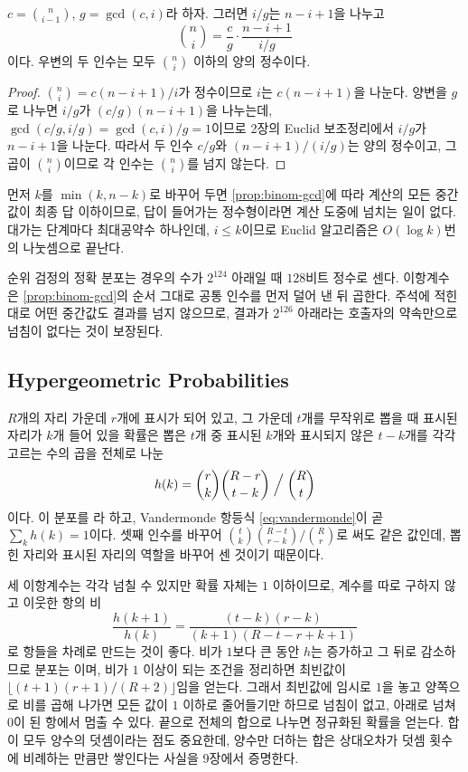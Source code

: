 \begin{proposition}
\label{prop:binom-gcd}
$c=\binom n{i-1}$, $g=\gcd(c,i)$라 하자. 그러면 $i/g$는 $n-i+1$을 나누고
\[
\binom ni=\frac cg\cdot\frac{n-i+1}{i/g}
\]
이다. 우변의 두 인수는 모두 $\binom ni$ 이하의 양의 정수이다.
\end{proposition}

\begin{proof}
$\binom ni=c(n-i+1)/i$가 정수이므로 $i$는 $c(n-i+1)$을 나눈다. 양변을 $g$로 나누면 $i/g$가 $(c/g)(n-i+1)$을 나누는데, $\gcd(c/g,i/g)=\gcd(c,i)/g=1$이므로 2장의 Euclid 보조정리에서 $i/g$가 $n-i+1$을 나눈다. 따라서 두 인수 $c/g$와 $(n-i+1)/(i/g)$는 양의 정수이고, 그 곱이 $\binom ni$이므로 각 인수는 $\binom ni$를 넘지 않는다.
\end{proof}

먼저 $k$를 $\min(k,n-k)$로 바꾸어 두면 \cref{prop:binom-gcd}에 따라 계산의 모든 중간값이 최종 답 이하이므로, 답이 들어가는 정수형이라면 계산 도중에 넘치는 일이 없다. 대가는 단계마다 최대공약수 하나인데, $i\le k$이므로 Euclid 알고리즘은 $O(\log k)$번의 나눗셈으로 끝난다.

\begin{instardust}
순위 검정의 정확 분포는 경우의 수가 $2^{124}$ 아래일 때 $128$비트 정수로 센다. 이항계수 은 \cref{prop:binom-gcd}의 순서 그대로 공통 인수를 먼저 덜어 낸 뒤 곱한다. 주석에 적힌 대로 어떤 중간값도 결과를 넘지 않으므로, 결과가 $2^{126}$ 아래라는 호출자의 약속만으로 넘침이 없다는 것이 보장된다.
\end{instardust}

\subsection{Hypergeometric Probabilities}

$R$개의 자리 가운데 $r$개에 표시가 되어 있고, 그 가운데 $t$개를 무작위로 뽑을 때 표시된 자리가 $k$개 들어 있을 확률은 뽑은 $t$개 중 표시된 $k$개와 표시되지 않은 $t-k$개를 각각 고르는 수의 곱을 전체로 나눈
\begin{equation}
\label{eq:hypergeom}
h(k)=\binom rk\binom{R-r}{t-k}\Bigm/\binom Rt
\end{equation}
이다. 이 분포를 라 하고, Vandermonde 항등식 \cref{eq:vandermonde}이 곧 $\sum_kh(k)=1$이다. 셋째 인수를 바꾸어 $\binom tk\binom{R-t}{r-k}/\binom Rr$로 써도 같은 값인데, 뽑힌 자리와 표시된 자리의 역할을 바꾸어 센 것이기 때문이다.

세 이항계수는 각각 넘칠 수 있지만 확률 자체는 $1$ 이하이므로, 계수를 따로 구하지 않고 이웃한 항의 비
\[
\frac{h(k+1)}{h(k)}=\frac{(t-k)(r-k)}{(k+1)(R-t-r+k+1)}
\]
로 항들을 차례로 만드는 것이 좋다. 비가 $1$보다 큰 동안 $h$는 증가하고 그 뒤로 감소하므로 분포는 이며, 비가 $1$ 이상이 되는 조건을 정리하면 최빈값이 $\lfloor(t+1)(r+1)/(R+2)\rfloor$임을 얻는다. 그래서 최빈값에 임시로 $1$을 놓고 양쪽으로 비를 곱해 나가면 모든 값이 $1$ 이하로 줄어들기만 하므로 넘침이 없고, 아래로 넘쳐 $0$이 된 항에서 멈출 수 있다. 끝으로 전체의 합으로 나누면 정규화된 확률을 얻는다. 합이 모두 양수의 덧셈이라는 점도 중요한데, 양수만 더하는 합은 상대오차가 덧셈 횟수에 비례하는 만큼만 쌓인다는 사실을 9장에서 증명한다.

